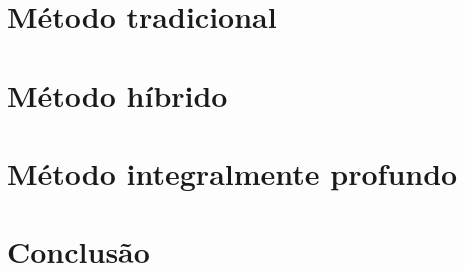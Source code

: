 \documentclass[a5paper]{ufsc-thesis}  %
\begin{document}
\pretextual%
\imprimircapa%
\imprimirfolhaderosto*%
\clearpage
\imprimirfichacatalografica%
\textual%



\chapter{Método tradicional}
\chapter{Método híbrido}
\chapter{Método integralmente profundo}
\chapter{Conclusão}
\end{document}
